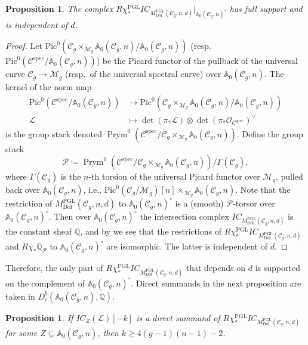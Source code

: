\documentclass[11pt,reqno]{amsart}
\theoremstyle{plain} %
\newtheorem{prop}[theorem]{Proposition}
\theoremstyle{definition}
\newcommand{\QQ}{\mathbb{Q}}
\newcommand{\M}{\mathcal{M}}
\newcommand{\C}{\mathcal{C}}
\DeclareMathOperator{\PGL}{PGL}
\newcommand{\Dol}{\mathrm{Dol}}
\newcommand{\Pic}{\mathrm{Pic}}
\newcommand{\IC}{IC}
\renewcommand{\AA}{\mathbb{A}}
\DeclareMathOperator{\Prym}{Prym}
\DeclareMathOperator{\spec}{spec}
\begin{document}
\begin{prop} \label{prop: torsor}
   The complex $R\chi^{\PGL}_* \IC_{M^{\PGL}_{\Dol}(\C_g,n,d)}|_{\AA_0(\C_g, n)^\circ}$ has full support and is independent of $d$.
\end{prop}

\begin{proof}
   Let $\Pic^0(\C_g \times_{\M_g} \AA_0(\C_g,n)/\AA_0(\C_g,n))$ (resp.\ $\Pic^0(\mathscr C^{\spec}/\AA_0(\C_g,n))$) be the Picard functor of the pullback of the universal curve $\mathcal{C}_g \to \M_g$ (resp.\ of the universal spectral curve) over $\AA_0(\C_g,n)$. The kernel of the norm map 
   \begin{align*}
       \Pic^0(\mathscr C^{\spec}/\AA_0(\C_g,n)) & \to \Pic^0(\C_g \times_{\M_g} \AA_0(\C_g,n)/\AA_0(\C_g,n))
    \\
    \mathcal{L} & \mapsto \det(\pi_*\mathcal{L}) \otimes \det(\pi_*\mathcal{O}_{\mathscr C^{\spec}})^{\vee}
   \end{align*}
is the group stack denoted $\Prym^0(\mathscr C^{\spec}/\C_g \times_{\M_g} \AA_0(\C_g,n))$.
   Define the group stack
    \begin{equation}\label{groupscheme}
        \mathscr P \coloneqq \Prym^0(\mathscr C^{\spec}/\C_g \times_{\M_g} \AA_0(\C_g,n))/\Gamma(\C_g),
    \end{equation}
    where $\Gamma(\C_g)$ is the $n$-th torsion of the universal Picard functor over $\M_g$, pulled back over $\AA_0(\C_g,n)$, i.e., $\Pic^0(\C_g/\M_g)[n] \times_{\M_g} \AA_0(\C_g,n)$. Note that the restriction of $M^{\PGL}_{\Dol}(\C_g,n,d)$ to $\AA_0(\C_g,n)^\circ$ is a (smooth) $\mathscr P$-torsor over $\AA_0(\C_g,n)^\circ$. Then over $\AA_0(\C_g,n)^\circ$ the intersection complex $\IC_{M^{\PGL}_{\Dol}(\C_g,n,d)}$ is the constant sheaf $\QQ$, and by \cite[Lemma 1.3.5]{PW} we see that the restrictions of $R\chi^{\PGL}_* \IC_{M^{\PGL}_{\Dol}(\C_g,n,d)}$ and $R\chi_* \QQ_{\mathscr P}$ to $\AA_0(\C_g,n)^\circ$ are isomorphic. The latter is independent of $d$.   
\end{proof}
    Therefore, the only part of $R\chi^{\PGL}_* \IC_{M^{\PGL}_{\Dol}(\C_g,n,d)}$ that depends on $d$ is supported on the complement of $\AA_0(\C_g,n)^\circ$. Direct summands in the next proposition are taken in $D^b_c(\AA_0(\C_g,n), \QQ)$.

\begin{prop} \label{prop: PGL d dependent}
If $\IC_{Z}(\mathcal{L})[-k]$ is a direct summand of $R\chi^{\PGL}_* \IC_{M^{\PGL}_{\Dol}(\C_g,n,d)}$ for some $Z \subsetneq \AA_0(\C_g,n)$, then $k \geq 4(g-1)(n-1)-2$.
\end{prop}
\end{document}
